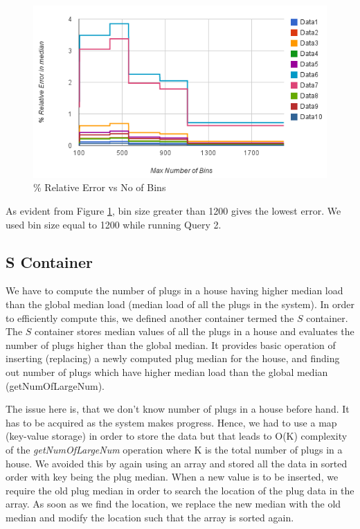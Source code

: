 \begin{figure}[h]
\begin{center}
\includegraphics[scale=0.5]{img/bin_size_experiment}
\vspace*{-0.4cm}
\caption{\% Relative Error vs No of Bins \label{fig:binsize}}
\end{center}
\end{figure}

As evident from Figure \ref{fig:binsize}, bin size greater than 1200 gives the lowest error.
We used bin size equal to 1200 while running Query 2.

\subsection{S Container}
We have to compute the number of plugs in a house having higher median load than the global median load (median load of all the plugs in the system).
In order to efficiently compute this, we defined another container termed the $S$ container.
The $S$ container stores median values of all the plugs in a house and evaluates the number of plugs higher than the global median.
It provides basic operation of inserting (replacing) a newly computed plug median for the house, and finding out number of plugs which have higher median load than the global median (getNumOfLargeNum).

The issue here is, that we don't know number of plugs in a house before hand.
It has to be acquired as the system makes progress.
Hence, we had to use a map (key-value storage) in order to store the data but that leads to O(K) complexity of the \textit{getNumOfLargeNum} operation where K is the total number of plugs in a house.
We avoided this by again using an array and stored all the data in sorted order with key being the plug median.
When a new value is to be inserted, we require the old plug median in order to search the location of the plug data in the array.
As soon as we find the location, we replace the new median with the old median and modify the location such that the array is sorted again.

